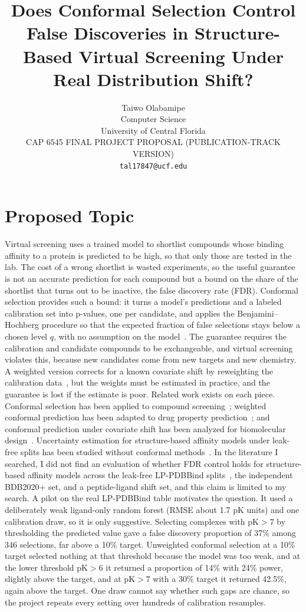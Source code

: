 \documentclass[10pt,twocolumn]{article}
\title{\textbf{Does Conformal Selection Control False Discoveries in Structure-Based Virtual Screening Under Real Distribution Shift?}}
\author{
  Taiwo Olabamipe \\
  Computer Science \\
  University of Central Florida \\
  CAP 6545 FINAL PROJECT PROPOSAL (PUBLICATION-TRACK VERSION) \\
  \texttt{tal17847@ucf.edu}
}
\date{}
\begin{document}
\maketitle

\section{Proposed Topic}

Virtual screening uses a trained model to shortlist compounds whose binding affinity to a protein is predicted to be high, so that only those are tested in the lab. The cost of a wrong shortlist is wasted experiments, so the useful guarantee is not an accurate prediction for each compound but a bound on the share of the shortlist that turns out to be inactive, the false discovery rate (FDR). Conformal selection provides such a bound: it turns a model's predictions and a labeled calibration set into p-values, one per candidate, and applies the Benjamini--Hochberg procedure so that the expected fraction of false selections stays below a chosen level $q$, with no assumption on the model~\cite{jin2023}. The guarantee requires the calibration and candidate compounds to be exchangeable, and virtual screening violates this, because new candidates come from new targets and new chemistry. A weighted version corrects for a known covariate shift by reweighting the calibration data~\cite{jin2026}, but the weights must be estimated in practice, and the guarantee is lost if the estimate is poor. Related work exists on each piece. Conformal selection has been applied to compound screening~\cite{bai2025}; weighted conformal prediction has been adapted to drug property prediction~\cite{codrug2023}; and conformal prediction under covariate shift has been analyzed for biomolecular design~\cite{fannjiang2022}. Uncertainty estimation for structure-based affinity models under leak-free splits has been studied without conformal methods~\cite{rayka2025}. In the literature I searched, I did not find an evaluation of whether FDR control holds for structure-based affinity models across the leak-free LP-PDBBind splits~\cite{lppdbbind}, the independent BDB2020+ set, and a peptide-ligand shift set, and this claim is limited to my search. A pilot on the real LP-PDBBind table motivates the question. It used a deliberately weak ligand-only random forest (RMSE about 1.7 pK units) and one calibration draw, so it is only suggestive. Selecting complexes with $\text{pK}>7$ by thresholding the predicted value gave a false discovery proportion of 37\% among 346 selections, far above a 10\% target. Unweighted conformal selection at a 10\% target selected nothing at that threshold because the model was too weak, and at the lower threshold $\text{pK}>6$ it returned a proportion of 14\% with 24\% power, slightly above the target, and at $\text{pK}>7$ with a 30\% target it returned 42.5\%, again above the target. One draw cannot say whether such gaps are chance, so the project repeats every setting over hundreds of calibration resamples.
\end{document}
